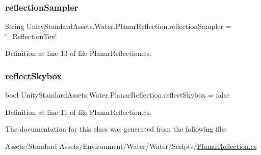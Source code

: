 \subsubsection{\texorpdfstring{reflection\+Sampler}{reflectionSampler}}
{\footnotesize\ttfamily String Unity\+Standard\+Assets.\+Water.\+Planar\+Reflection.\+reflection\+Sampler = \char`\"{}\+\_\+\+Reflection\+Tex\char`\"{}}



Definition at line 13 of file Planar\+Reflection.\+cs.

\mbox{\label{class_unity_standard_assets_1_1_water_1_1_planar_reflection_ac9d2d7b456df4e66601c899f34520dce}} 
\subsubsection{\texorpdfstring{reflect\+Skybox}{reflectSkybox}}
{\footnotesize\ttfamily bool Unity\+Standard\+Assets.\+Water.\+Planar\+Reflection.\+reflect\+Skybox = false}



Definition at line 11 of file Planar\+Reflection.\+cs.



The documentation for this class was generated from the following file\+:\begin{DoxyCompactItemize}
\item 
Assets/\+Standard Assets/\+Environment/\+Water/\+Water/\+Scripts/\mbox{\hyperlink{_planar_reflection_8cs}{Planar\+Reflection.\+cs}}\end{DoxyCompactItemize}
